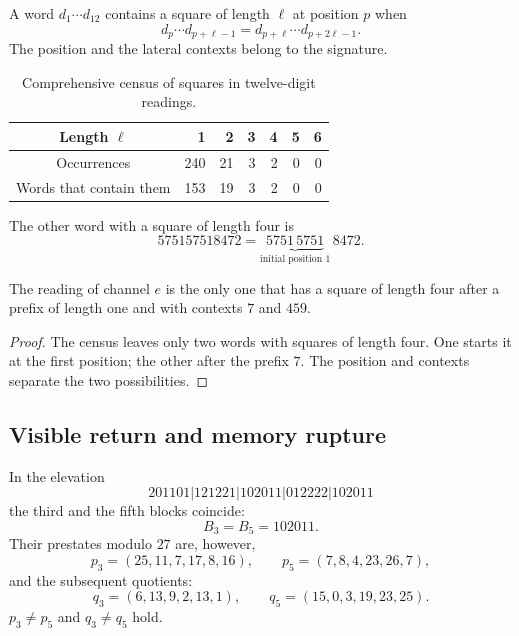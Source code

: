 \begin{definition}
A word \(d_1\cdots d_{12}\) contains a square of length \(\ell\)
at position \(p\) when
\[
 d_p\cdots d_{p+\ell-1}
 =d_{p+\ell}\cdots d_{p+2\ell-1}.
\]
The position and the lateral contexts belong to the signature.
\end{definition}

\begin{table}[htbp]
\centering
\caption{Comprehensive census of squares in twelve-digit readings.}
\label{p12-83-c9-s2:tab:censo-cuadrados-e}
\begin{tabular}{c*{6}{r}}
\toprule
Length \(\ell\)&1&2&3&4&5&6\\
\midrule
Occurrences&240&21&3&2&0&0\\
Words that contain them&153&19&3&2&0&0\\
\bottomrule
\end{tabular}
\end{table}

The other word with a square of length four is
\[
 575157518472
 =\underbrace{5751\,5751}_{\text{initial position }1}\,8472.
\]

\begin{proposition}
\label{p12-83-c9-s2:prop:cuadrado-posicional-e}
The reading of channel \(e\) is the only one that has a square of length
four after a prefix of length one and with contexts \(7\) and \(459\).
\end{proposition}

\begin{proof}
The census leaves only two words with squares of length four. One starts
it at the first position; the other after the prefix \(7\). The
position and contexts separate the two possibilities.
\end{proof}

\subsection{Visible return and memory rupture}

In the elevation
\[
 201101|121221|102011|012222|102011
\]
the third and the fifth blocks coincide:
\[
 B_3=B_5=102011.
\]
Their prestates modulo \(27\) are, however,
\[
 p_3=(25,11,7,17,8,16),
 \qquad
 p_5=(7,8,4,23,26,7),
\]
and the subsequent quotients:
\[
 q_3=(6,13,9,2,13,1),
 \qquad
 q_5=(15,0,3,19,23,25).
\]
\(p_3\ne p_5\) and \(q_3\ne q_5\) hold.

